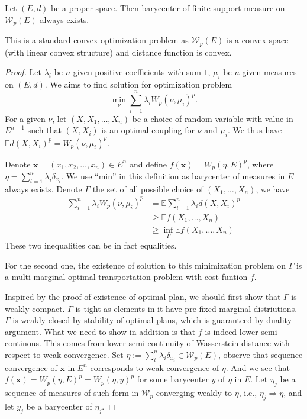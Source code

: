 \begin{thm}
	Let $(E,d)$ be a proper space. Then barycenter of finite support measure on $\mathcal{W}_p(E)$ always exists.
\end{thm}

This is a standard convex optimization problem as $\mathcal{W}_p(E)$ is a convex space (with linear convex structure) and distance function is convex.

\begin{proof}
	Let $\lambda_i$ be $n$ given positive coefficients with sum $1$, $\mu_i$ be $n$ given measures on $(E,d)$. We aims to find solution for optimization problem
	\[
		\min_{\nu} \sum_{i=1}^{n}\lambda_i W_p(\nu, \mu_i)^p.
	\]
	For a given $\nu$, let $(X, X_1,\ldots,X_n)$ be a choice of random variable with value in $E^{n+1}$ such that $(X,X_i)$ is an optimal coupling for $\nu$ and $\mu_i$. We thus have $\mathbb{E}d(X,X_i)^p = W_p(\nu, \mu_i)^p$.

	Denote $\boldsymbol{x}=(x_1, x_2, \ldots, x_n) \in E^n$ and define $f(\boldsymbol{x})= W_p(\eta, E)^p$, where $\eta = \sum_{i=1}^{n} \lambda_i \delta_{x_i}$. We use ``min'' in this definition as barycenter of measures in $E$ always exists. Denote $\Gamma$ the set of all possible choice of $(X_1, \ldots, X_n)$, we have
	\begin{align*}
		\sum_{i=1}^{n}\lambda_i W_p(\nu, \mu_i)^p &= \mathbb{E} \sum_{i=1}^{n}\lambda_i d(X,X_i)^p \\
																						&\geq \mathbb{E} f(X_1, \ldots, X_n)\\
																						&\geq \inf_\Gamma \mathbb{E} f(X_1, \ldots, X_n)
	\end{align*}
	These two inequalities can be in fact equalities.

		For the second one, the existence of solution to this minimization problem on $\Gamma$ is a multi-marginal optimal transportation problem with cost funtion $f$. 

		Inspired by the proof of existence of optimal plan, we should first show that $\Gamma$ is weakly compact. $\Gamma$ is tight as elements in it have pre-fixed marginal distriutions. $\Gamma$ is weakly closed by stability of optimal plans, which is guaranteed by duality argument. What we need to show in addition is that $f$ is indeed lower semi-continous. This comes from lower semi-continuity of Wasserstein distance with respect to weak convergence. Set $\eta:= \sum_i^{n}\lambda_i \delta_{x_i} \in \mathcal{W}_p(E)$, observe that sequence convergence of $\boldsymbol{x}$ in $E^n$ corresponds to weak convergence of $\eta$. And we see that $f(\boldsymbol{x}) = W_p(\eta, E)^p=W_p(\eta, y)^p$ for some barycenter $y$ of $\eta$ in $E$. Let $\eta_j$ be a sequence of measures of such form in $\mathcal{W}_p$ converging weakly to $\eta$, i.e., $\eta_j \Rightarrow \eta$, and let $y_j$ be a barycenter of $\eta_j$.


\end{proof}

